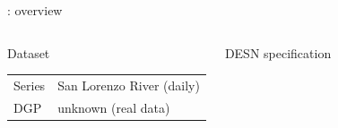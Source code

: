 \begin{frame}{\casetitleprefix: overview}
  \begin{columns}[T,onlytextwidth]
      \begin{whiteblock}{\small Dataset}
      \scriptsize
      \begin{tabular}{@{}l l@{}}
        Series & San Lorenzo River (daily) \\
        DGP & unknown (real data) \\
      \end{tabular}
      \end{whiteblock}
      \begin{whiteblock}{\small DESN specification}
      \tiny
      \vspace{-0.2em}
      
      \end{whiteblock}
  \end{columns}
\end{frame}
